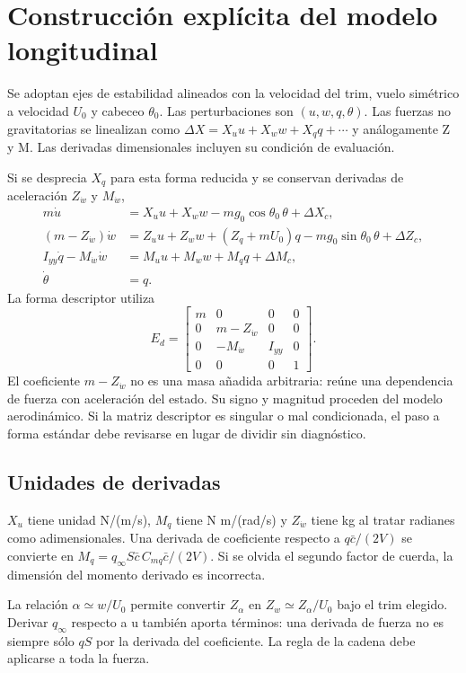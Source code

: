 \section{Construcción explícita del modelo longitudinal}
Se adoptan ejes de estabilidad alineados con la velocidad del trim, vuelo simétrico a velocidad $U_0$ y cabeceo $\theta_0$. Las perturbaciones son $(u,w,q,\theta)$. Las fuerzas no gravitatorias se linealizan como $\Delta X=X_uu+X_ww+X_qq+\cdots$ y análogamente Z y M. Las derivadas dimensionales incluyen su condición de evaluación.

Si se desprecia $X_q$ para esta forma reducida y se conservan derivadas de aceleración $Z_{\dot w}$ y $M_{\dot w}$,
\begin{align}
m\dot u&=X_uu+X_ww-mg_0\cos\theta_0\,\theta+\Delta X_c,\\
(m-Z_{\dot w})\dot w&=Z_uu+Z_ww+(Z_q+mU_0)q-mg_0\sin\theta_0\,\theta+\Delta Z_c,\\
I_{yy}\dot q-M_{\dot w}\dot w&=M_uu+M_ww+M_qq+\Delta M_c,\\
\dot\theta&=q.
\end{align}
La forma descriptor utiliza
\begin{equation}
E_d=\begin{bmatrix}m&0&0&0\\0&m-Z_{\dot w}&0&0\\0&-M_{\dot w}&I_{yy}&0\\0&0&0&1\end{bmatrix}.
\end{equation}
El coeficiente $m-Z_{\dot w}$ no es una masa añadida arbitraria: reúne una dependencia de fuerza con aceleración del estado. Su signo y magnitud proceden del modelo aerodinámico. Si la matriz descriptor es singular o mal condicionada, el paso a forma estándar debe revisarse en lugar de dividir sin diagnóstico.

\subsection{Unidades de derivadas}
$X_u$ tiene unidad N/(m/s), $M_q$ tiene N m/(rad/s) y $Z_{\dot w}$ tiene kg al tratar radianes como adimensionales. Una derivada de coeficiente respecto a $q\bar c/(2V)$ se convierte en $M_q=q_\infty S\bar c\,C_{mq}\bar c/(2V)$. Si se olvida el segundo factor de cuerda, la dimensión del momento derivado es incorrecta.

La relación $\alpha\simeq w/U_0$ permite convertir $Z_\alpha$ en $Z_w\simeq Z_\alpha/U_0$ bajo el trim elegido. Derivar $q_\infty$ respecto a u también aporta términos: una derivada de fuerza no es siempre sólo $qS$ por la derivada del coeficiente. La regla de la cadena debe aplicarse a toda la fuerza.

